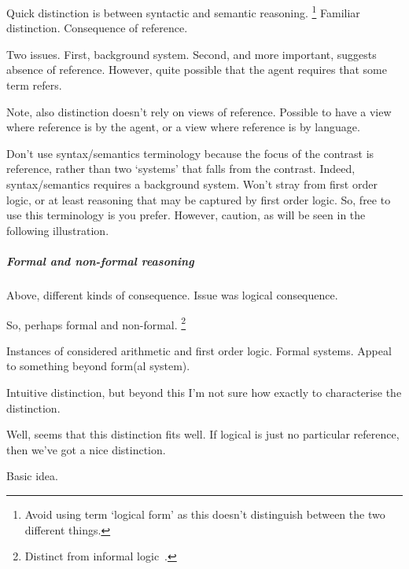 \begin{note}
  Quick distinction is between syntactic and semantic reasoning.\nolinebreak
  \footnote{
    Avoid using term `logical form' as this doesn't distinguish between the two different things.
  }
  Familiar distinction.
  Consequence of reference.

  Two issues.
  First, background system.
  Second, and more important, suggests absence of reference.
  However, quite possible that the agent requires that some term refers.

  Note, also distinction doesn't rely on views of reference.
  Possible to have a view where reference is by the agent, or a view where reference is by language.
\end{note}

\begin{note}
  Don't use syntax/semantics terminology because the focus of the contrast is reference, rather than two `systems' that falls from the contrast.
  Indeed, syntax/semantics requires a background system.
  Won't stray from first order logic, or at least reasoning that may be captured by first order logic.
  So, free to use this terminology is you prefer.
  However, caution, as will be seen in the following illustration.
\end{note}

\subparagraph*{Formal and non-formal reasoning}

 \cite{Beall:2019ty}

\begin{note}
  Above, different kinds of consequence.
  Issue was logical consequence.

  So, perhaps formal and non-formal.\nolinebreak
  \footnote{
    Distinct from informal logic~\textcite{Groarke:2021tk}.
  }

  Instances of \nr{} considered arithmetic and first order logic.
  Formal systems.
  Appeal to something beyond form(al system).

  Intuitive distinction, but beyond this I'm not sure how exactly to characterise the distinction.

  Well, seems that this distinction fits well.
  If logical is just no particular reference, then we've got a nice distinction.
\end{note}

\begin{note}
  Basic idea.
\end{note}

